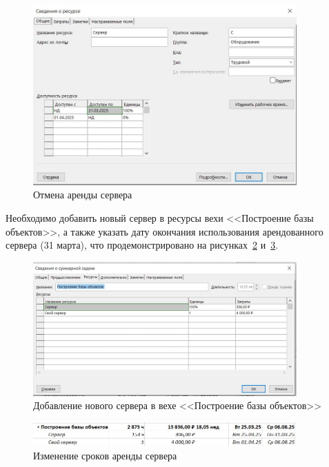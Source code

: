 \begin{figure}[H]
	\centering
	\includegraphics[width=0.9\textwidth]{img/screen23.jpg}
	\caption{Отмена аренды сервера}
	\label{fig:screen23}
\end{figure}

Необходимо добавить новый сервер в ресурсы вехи <<Построение базы объектов>>, а также указать дату окончания использования арендованного сервера (31 марта), что продемонстрировано на рисунках~\ref{fig:screen24} и~\ref{fig:screen25}.

\begin{figure}[H]
	\centering
	\includegraphics[width=0.9\textwidth]{img/screen24.jpg}
	\caption{Добавление нового сервера в вехе <<Построение базы объектов>>}
	\label{fig:screen24}
\end{figure}

\begin{figure}[H]
	\centering
	\includegraphics[width=0.9\textwidth]{img/screen25.jpg}
	\caption{Изменение сроков аренды сервера}
	\label{fig:screen25}
\end{figure}

